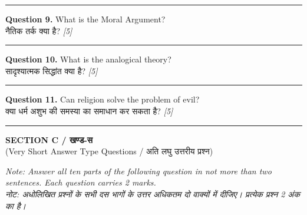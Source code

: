 \documentclass[11pt,a4paper]{article}
\newcommand{\pts}[1]{\hfill \textit{[#1]}}
\begin{document}
\medskip\rule{\linewidth}{0.2pt}\medskip

\noindent \textbf{Question 9.} What is the Moral Argument?\\[1pt]
नैतिक तर्क क्या है? \pts{5}

\medskip\rule{\linewidth}{0.2pt}\medskip

\noindent \textbf{Question 10.} What is the analogical theory?\\[1pt]
सादृश्यात्मक सिद्धांत क्या है? \pts{5}

\medskip\rule{\linewidth}{0.2pt}\medskip

\noindent \textbf{Question 11.} Can religion solve the problem of evil?\\[1pt]
क्या धर्म अशुभ की समस्या का समाधान कर सकता है? \pts{5}

\bigskip
\rule{\linewidth}{0.2pt}
\bigskip

\begin{center}
  {\large\bfseries SECTION C / खण्ड-स}\\[2pt]
  {\normalsize (Very Short Answer Type Questions / अति लघु उत्तरीय प्रश्न)}
\end{center}

\noindent \textit{Note: Answer all ten parts of the following question in not more than two sentences. Each question carries 2 marks.}\\[2pt]
\noindent \textit{नोट: अधोलिखित प्रश्नों के सभी दस भागों के उत्तर अधिकतम दो वाक्यों में दीजिए। प्रत्येक प्रश्न 2 अंक का है।}

\bigskip
\end{document}

